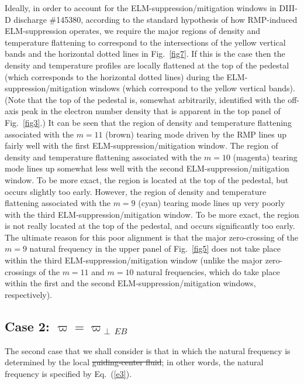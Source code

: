 \documentclass[12pt,prb,aps]{revtex4-1}
\providecommand{\DIFadd}[1]{{\protect\color{blue}\uwave{#1}}} %
\providecommand{\DIFdel}[1]{{\protect\color{red}\sout{#1}}}                      %
\providecommand{\DIFaddbegin}{} %
\providecommand{\DIFaddend}{} %
\providecommand{\DIFdelbegin}{} %
\providecommand{\DIFdelend}{} %
\begin{document}
 Ideally, in order to account for the
ELM-suppression/mitigation windows in DIII-D discharge \#145380, according to the standard
hypothesis of how RMP-induced ELM-suppression operates, we require the major regions of density and temperature
flattening to correspond to the intersections of the yellow vertical bands and the horizontal dotted lines in Fig.~\ref{fig7}. If this is the case then
the density and temperature profiles are locally flattened at the top of the pedestal (which corresponds to
the horizontal dotted lines) during the ELM-suppression/mitigation windows (which correspond to the yellow vertical bands). (Note that the top of the pedestal
is, somewhat arbitrarily, identified with the off-axis peak in the electron number density that is apparent in the top panel of Fig.~\ref{fig3}.) It can be seen
that the region of density and temperature flattening associated with the $m=11$ (brown) tearing mode driven by the RMP lines up fairly well with the
first ELM-suppression/mitigation window. The region of density and temperature flattening associated with the $m=10$ (magenta) tearing mode 
lines up somewhat less well with the second ELM-suppression/mitigation window. To be more exact, the region is located at the top of the pedestal,
but occurs slightly too early. However, the 
region of density and temperature flattening associated with the $m=9$ (cyan) tearing mode 
lines up very poorly with the third ELM-suppression/mitigation window. To be more exact, the region is not really located at the top of the pedestal, and occurs
significantly too early. The ultimate reason for this poor alignment is that the major zero-crossing of the $m=9$ natural
frequency in the upper panel of Fig.~\ref{fig5} does not take place within the third ELM-suppression/mitigation window (unlike the
major zero-crossings of the $m=11$ and $m=10$ natural frequencies, which do take place within the first and the second
ELM-suppression/mitigation windows, respectively). 

\subsection{Case 2: $\varpi=\varpi_{\perp\,EB}$}
The second case that we shall consider is that in which the natural frequency is determined by the local \DIFdelbegin \DIFdel{guiding-center fluid}\DIFdelend \DIFaddbegin \DIFadd{${\bf E}\times {\bf B}$ velocity}\DIFaddend ; 
in other words, the natural frequency is specified by Eq.~(\ref{e3}). 
\end{document}
